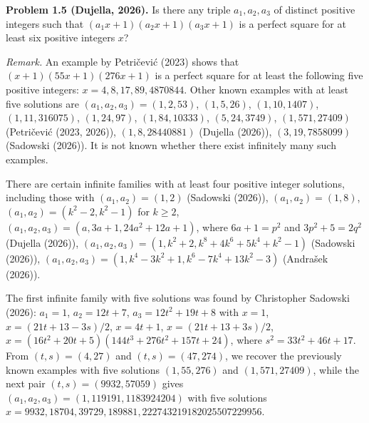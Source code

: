 \textbf{Problem 1.5 (Dujella, 2026).} Is there any triple $a_1, a_2, a_3$ of distinct positive integers such that $(a_1x+1)(a_2x+1)(a_3x+1)$ is a perfect square for at least six positive integers $x$?

\medskip

\textit{Remark.} An example by Petričević (2023) shows that $(x+1)(55x+1)(276x+1)$ is a perfect square for at least the following five positive integers: $x = 4, 8, 17, 89, 4870844$. Other known examples with at least five solutions are $(a_1,a_2,a_3) = (1,2,53)$, $(1,5,26)$, $(1,10,1407)$, $(1,11,316075)$, $(1,24,97)$, $(1,84,10333)$, $(5,24,3749)$, $(1,571,27409)$ (Petričević (2023, 2026)), $(1,8,28440881)$ (Dujella (2026)), $(3,19,7858099)$ (Sadowski (2026)). It is not known whether there exist infinitely many such examples.

There are certain infinite families with at least four positive integer solutions, including those with $(a_1,a_2) = (1,2)$ (Sadowski (2026)), $(a_1,a_2) = (1,8)$, $(a_1,a_2) = (k^2-2, k^2-1)$ for $k \geqslant 2$, $(a_1,a_2,a_3) = (a, 3a+1, 24a^2+12a+1)$, where $6a+1 = p^2$ and $3p^2+5 = 2q^2$ (Dujella (2026)), $(a_1,a_2,a_3) = (1, k^2+2, k^8+4k^6+5k^4+k^2-1)$ (Sadowski (2026)), $(a_1,a_2,a_3) = (1, k^4-3k^2+1, k^6-7k^4+13k^2-3)$ (Andrašek (2026)).

The first infinite family with five solutions was found by Christopher Sadowski (2026): $a_1=1$, $a_2=12t+7$, $a_3=12t^2+19t+8$ with $x=1$, $x=(21t+13-3s)/2$, $x=4t+1$, $x=(21t+13+3s)/2$, $x=(16t^2+20t+5)(144t^3+276t^2+157t+24)$, where $s^2 = 33t^2+46t+17$. From $(t,s)=(4,27)$ and $(t,s)=(47,274)$, we recover the previously known examples with five solutions $(1,55,276)$ and $(1,571,27409)$, while the next pair $(t,s)=(9932,57059)$ gives $(a_1,a_2,a_3)=(1,119191,1183924204)$ with five solutions $x = 9932, 18704, 39729, 189881, 222743219182025507229956$.
